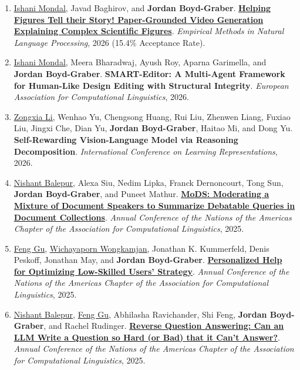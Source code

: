 {\begin{enumerate}
	 \item \underline{\href{https://ishani-mondal.github.io/}{Ishani Mondal}}, Javad Baghirov, and {\bf Jordan Boyd-Graber}.  {\bf \href{http://cs.umd.edu/~jbg//docs/2026_emnlp_figure_video.pdf}{Helping Figures Tell their Story! Paper-Grounded Video Generation Explaining Complex Scientific Figures}}.  \emph{Empirical Methods in Natural Language Processing}, 2026 (15.4\% Acceptance Rate).

	 \item \underline{\href{https://ishani-mondal.github.io/}{Ishani Mondal}}, Meera Bharadwaj, Ayush Roy, Aparna Garimella, and {\bf Jordan Boyd-Graber}.  {\bf SMART-Editor: A Multi-Agent Framework for Human-Like Design Editing with Structural Integrity}.  \emph{European Association for Computational Linguistics}, 2026.

	 \item \underline{\href{https://zli12321.github.io/}{Zongxia Li}}, Wenhao Yu, Chengsong Huang, Rui Liu, Zhenwen Liang, Fuxiao Liu, Jingxi Che, Dian Yu, {\bf Jordan Boyd-Graber}, Haitao Mi, and Dong Yu.  {\bf Self-Rewarding Vision-Language Model via Reasoning Decomposition}.  \emph{International Conference on Learning Representations}, 2026.

	 \item \underline{\href{https://nbalepur.github.io/}{Nishant Balepur}}, Alexa Siu, Nedim Lipka, Franck Dernoncourt, Tong Sun, {\bf Jordan Boyd-Graber}, and Puneet Mathur.  {\bf \href{http://cs.umd.edu/~jbg//docs/2025_naacl_mods.pdf}{MoDS: Moderating a Mixture of Document Speakers to Summarize Debatable Queries in Document Collections}}.  \emph{Annual Conference of the Nations of the Americas Chapter of the Association for Computational Linguistics}, 2025.

	 \item \underline{Feng Gu}, \underline{\href{https://wwongkamjan.github.io}{Wichayaporn Wongkamjan}}, Jonathan K. Kummerfeld, Denis Peskoff, Jonathan May, and {\bf Jordan Boyd-Graber}.  {\bf \href{http://cs.umd.edu/~jbg//docs/2025_naacl_pholus.pdf}{Personalized Help for Optimizing Low-Skilled Users' Strategy}}.  \emph{Annual Conference of the Nations of the Americas Chapter of the Association for Computational Linguistics}, 2025.

	 \item \underline{\href{https://nbalepur.github.io/}{Nishant Balepur}}, \underline{Feng Gu}, Abhilasha Ravichander, Shi Feng, {\bf Jordan Boyd-Graber}, and Rachel Rudinger.  {\bf \href{http://cs.umd.edu/~jbg//docs/2025_naacl_reverseqa.pdf}{Reverse Question Answering: Can an LLM Write a Question so Hard (or Bad) that it Can't Answer?}}.  \emph{Annual Conference of the Nations of the Americas Chapter of the Association for Computational Linguistics}, 2025.


\end{enumerate}}
